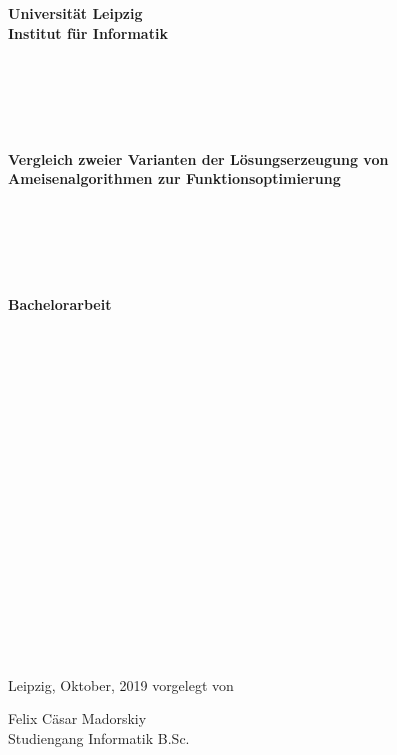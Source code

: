 \documentclass[fontsize=12, a4aper]{scrartcl}
\begin{document}
	
	
	
	\begin{center}
		
		\fontsize{14pt}{12pt}
		
		\textbf{Universität Leipzig}\\
		\textbf{Institut für Informatik}\\
		
	\end{center}
	
	\begin{verbatim}
	
	
	
	
	\end{verbatim}
	
	\begin{center}
		
		\fontsize{14pt}{12pt}
		
		\textbf{Vergleich zweier Varianten der Lösungserzeugung von Ameisenalgorithmen zur Funktionsoptimierung}
		
	\end{center}
	
	\begin{verbatim}
	
	
	
	
	\end{verbatim}
	
	\begin{center}
		
		\fontsize{18pt}{12pt}
		
		\textbf{Bachelorarbeit}
		
	\end{center}
	
	\begin{verbatim}
	
	
	
	
	
	
	
	
	
	
	
	
	
	
	
	
	
	\end{verbatim}
	
	\begin{flushright}
		
		Leipzig, Oktober, 2019 \hfill vorgelegt von\\
		
		\bigskip
		
		Felix Cäsar Madorskiy\\
		Studiengang Informatik B.Sc.
		
	\end{flushright}
	
\end{document}
